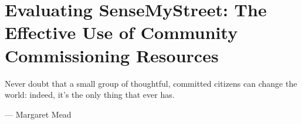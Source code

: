 \chapter[Evaluating SenseMyStreet]{Evaluating SenseMyStreet: The Effective Use of Community Commissioning Resources}
\label{chap:sensemystreet-eval}


\ifpdf
    \graphicspath{{Chapter3/Figs/Raster/}{Chapter3/Figs/PDF/}{Chapter3/Figs/}}
\else
    \graphicspath{{Chapter3/Figs/Vector/}{Chapter3/Figs/}}
\fi

\epigraph{Never doubt that a small group of thoughtful, committed citizens can change the world: indeed, it’s the only thing that ever has.}{--- \textup{Margaret Mead}}

